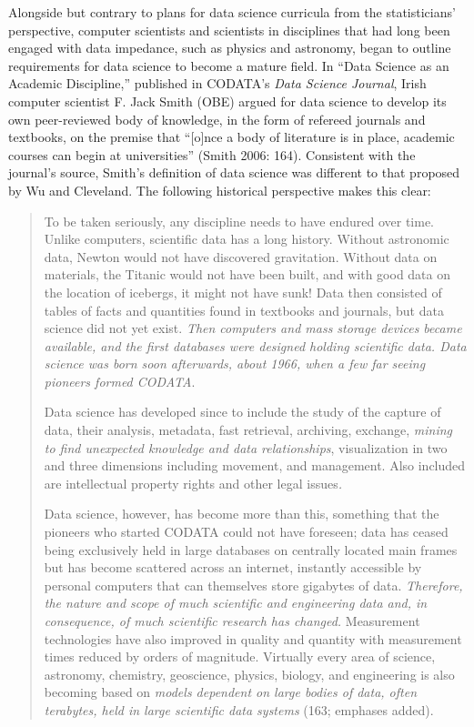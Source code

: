 \documentclass[
  letterpaper,
]{report}
\begin{document}
Alongside but contrary to plans for data science curricula from the
statisticians' perspective, computer scientists and scientists in
disciplines that had long been engaged with data impedance, such as
physics and astronomy, began to outline requirements for data science to
become a mature field. In ``Data Science as an Academic Discipline,''
published in CODATA's \emph{Data Science Journal}, Irish computer
scientist F. Jack Smith (OBE) argued for data science to develop its own
peer-reviewed body of knowledge, in the form of refereed journals and
textbooks, on the premise that ``{[}o{]}nce a body of literature is in
place, academic courses can begin at universities'' (Smith 2006: 164).
Consistent with the journal's source, Smith's definition of data science
was different to that proposed by Wu and Cleveland. The following
historical perspective makes this clear:

\begin{quote}
To be taken seriously, any discipline needs to have endured over time.
Unlike computers, scientific data has a long history. Without astronomic
data, Newton would not have discovered gravitation. Without data on
materials, the Titanic would not have been built, and with good data on
the location of icebergs, it might not have sunk! Data then consisted of
tables of facts and quantities found in textbooks and journals, but data
science did not yet exist. \emph{Then computers and mass storage devices
became available, and the first databases were designed holding
scientific data. Data science was born soon afterwards, about 1966, when
a few far seeing pioneers formed CODATA}.

Data science has developed since to include the study of the capture of
data, their analysis, metadata, fast retrieval, archiving, exchange,
\emph{mining to find unexpected knowledge and data relationships},
visualization in two and three dimensions including movement, and
management. Also included are intellectual property rights and other
legal issues\emph{.}

Data science, however, has become more than this, something that the
pioneers who started CODATA could not have foreseen; data has ceased
being exclusively held in large databases on centrally located main
frames but has become scattered across an internet, instantly accessible
by personal computers that can themselves store gigabytes of data.
\emph{Therefore, the nature and scope of much scientific and engineering
data and, in consequence, of much scientific research has changed.}
Measurement technologies have also improved in quality and quantity with
measurement times reduced by orders of magnitude. Virtually every area
of science, astronomy, chemistry, geoscience, physics, biology, and
engineering is also becoming based on \emph{models dependent on large
bodies of data, often terabytes, held in large scientific data systems}
(163; emphases added).
\end{quote}
\end{document}

